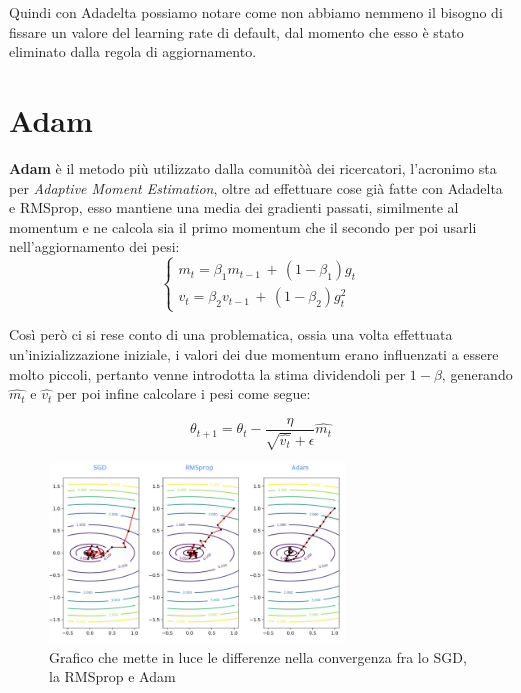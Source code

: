 Quindi con Adadelta possiamo notare come non abbiamo nemmeno il bisogno di fissare un valore del learning rate di default, dal momento che esso è stato eliminato dalla regola di aggiornamento.

\section{Adam}
\textbf{Adam} è il metodo più utilizzato dalla comunitòà dei ricercatori, l'acronimo sta per \textit{Adaptive Moment Estimation}, oltre ad effettuare cose già fatte con Adadelta e RMSprop, esso mantiene una media dei gradienti passati, similmente al momentum e ne calcola sia il primo momentum che il secondo per poi usarli nell'aggiornamento dei pesi:
\begin{equation}
    \left\{\begin{array}{c}
    m_t = \beta_1 m_{t-1}\,+\, (1-\beta_1)g_t
    \\
    v_t = \beta_2 v_{t-1}\,+\, (1-\beta_2)g_t^2
    \end{array}\right.
\end{equation}

Così però ci si rese conto di una problematica, ossia una volta effettuata un'inizializzazione iniziale, i valori dei due momentum erano influenzati a essere molto piccoli, pertanto venne introdotta la stima dividendoli per $1-\beta$, generando $\hat{m_t}$ e $\hat{v_t}$ per poi infine calcolare i pesi come segue:

\begin{equation}
    \theta_{t+1} = \theta_t - \frac{\eta}{\sqrt{\hat{v_t}}+\epsilon}\hat{m_t} 
\end{equation}
\begin{figure}
    \centering
    \includegraphics[width=0.7\textwidth]{figure/sgrmspropadam.png}
    \caption{Grafico che mette in luce le differenze nella convergenza fra lo SGD, la RMSprop e Adam}
    \label{fig:diffAdamSGDRMSprop}
\end{figure}

